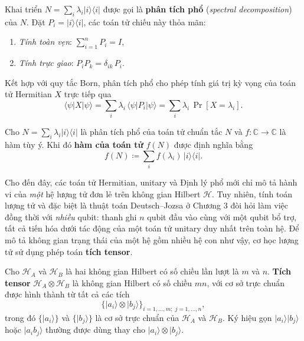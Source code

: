 \begin{remark}
Khai triển $N = \sum_i \lambda_i |i\rangle\langle i|$ được gọi là
\textbf{phân tích phổ} (\textit{spectral decomposition}) của $N$.
Đặt $P_i = |i\rangle\langle i|$, các toán tử chiếu này thỏa mãn:
\begin{enumerate}[label=(\roman*)]
    \item \textit{Tính toàn vẹn}:
          $\displaystyle\sum_{i=1}^n P_i = I$,
    \item \textit{Tính trực giao}:
          $P_i P_k = \delta_{ik}\, P_i$.
\end{enumerate}
Kết hợp với quy tắc Born, phân tích phổ cho phép
tính giá trị kỳ vọng của toán tử Hermitian $X$ trực tiếp qua
$$\langle\psi|X|\psi\rangle
  = \sum_i \lambda_i\,\langle\psi|P_i|\psi\rangle
  = \sum_i \lambda_i\,\Pr[X = \lambda_i].$$
\end{remark}

\begin{corollary}
\label{cor:function-of-operator}
Cho $N = \sum_i \lambda_i |i\rangle\langle i|$ là phân tích phổ của toán tử chuẩn tắc
$N$ và $f: \mathbb{C} \to \mathbb{C}$ là hàm tùy ý. Khi đó \textbf{hàm của toán tử}
$f(N)$ được định nghĩa bằng
$$f(N) \coloneqq \sum_i f(\lambda_i)\, |i\rangle\langle i|.$$
\end{corollary}

Cho đến đây, các toán tử Hermitian, unitary và Định lý phổ mới chỉ mô tả hành vi của \emph{một} hệ lượng tử đơn lẻ trên không gian Hilbert $\mathcal{H}$. Tuy nhiên, tính toán lượng tử và đặc biệt là thuật toán Deutsch--Jozsa ở Chương 3 đòi hỏi làm việc đồng thời với \emph{nhiều} qubit: thanh ghi $n$ qubit đầu vào cùng với một qubit bổ trợ, tất cả tiến hóa dưới tác động của một toán tử unitary duy nhất trên toàn hệ. Để mô tả không gian trạng thái của một hệ gồm nhiều hệ con như vậy, cơ học lượng tử sử dụng phép toán \textbf{tích tensor}. 
\label{subsec:tensor}
    
    \begin{definition}
    Cho $\mathcal{H}_A$ và $\mathcal{H}_B$ là hai không gian Hilbert có số chiều lần lượt
    là $m$ và $n$. \textbf{Tích tensor} $\mathcal{H}_A \otimes \mathcal{H}_B$ là không gian
    Hilbert có số chiều $mn$, với cơ sở trực chuẩn được hình thành từ tất cả các tích
    $$\{|a_i\rangle \otimes |b_j\rangle\}_{i=1,\dots,m;\; j=1,\dots,n},$$
    trong đó $\{|a_i\rangle\}$ và $\{|b_j\rangle\}$ là cơ sở trực chuẩn của $\mathcal{H}_A$
    và $\mathcal{H}_B$. Ký hiệu gọn $|a_i\rangle|b_j\rangle$ hoặc $|a_i b_j\rangle$
    thường được dùng thay cho $|a_i\rangle \otimes |b_j\rangle$.
    \end{definition}
    
